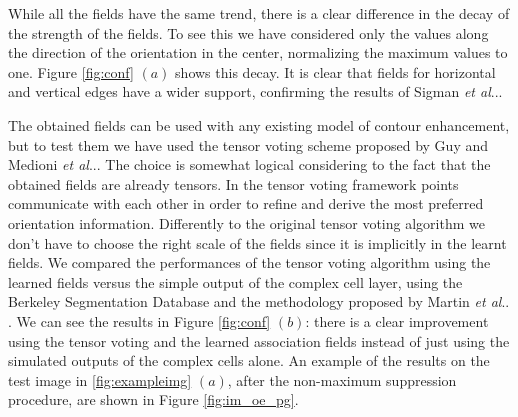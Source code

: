 \documentclass{llncs}
\makeatletter
\DeclareRobustCommand\onedot{\futurelet\@let@token\@onedot}
\def\@onedot{\ifx\@let@token.\else.\null\fi\xspace}
\def\etal{\emph{et al}\onedot}
\makeatother
\begin{document}
While all the fields have the same trend, there is a clear difference in the
decay of the strength of the fields. To see this we have considered only the
values along the direction of the orientation in the center, normalizing the
maximum values to one. Figure \ref{fig:conf} $(a)$ shows this decay.
It is clear that fields for horizontal and vertical edges have a wider support,
confirming the results of Sigman \etal \cite{Sigman01}.

The obtained fields can be used with any existing model of contour enhancement,
but to test them we have used the tensor voting scheme proposed by
Guy and Medioni \etal \cite{Guy96}. The choice is somewhat logical considering
to the fact that the obtained fields are already tensors. In the tensor voting
framework points communicate with each other in order to refine and derive the
most preferred orientation information. Differently to the original tensor
voting algorithm we don't have to choose the right scale of the fields
\cite{LeeM99} since it is implicitly in the learnt fields.
We compared the performances of the tensor voting algorithm using the learned
fields versus the simple output of the complex cell layer, using the Berkeley
Segmentation Database and the methodology proposed by Martin \etal
\cite{MartinFM04,MartinFTM01}. We can see the results in Figure
\ref{fig:conf} $(b)$: there is a clear improvement using the tensor voting and
the learned association fields instead of just using the simulated outputs of
the complex cells alone. An example of the results on the test image in
\ref{fig:exampleimg} $(a)$, after the non-maximum suppression procedure, are
shown in Figure \ref{fig:im_oe_pg}.

\end{document}
